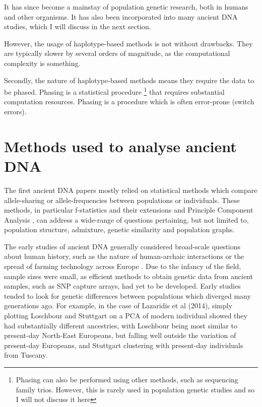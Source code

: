 It has since become a mainstay of population genetic research, both in humans and other organisms. It has also been incorporated into many ancient DNA studies, which I will discuss in the next section. 

However, the usage of haplotype-based methods is not without drawbacks. They are typically slower by several orders of magnitude, as the computational complexity is something. 

Secondly, the nature of haplotype-based methods means they require the data to be phased. Phasing is a statistical procedure \footnote{Phasing can also be performed using other methods, such as sequencing family trios. However, this is rarely used in population genetic studies and so I will not discuss it here} that requires substantial computation resources. Phasing is a procedure which is often error-prone (switch errors).


\section{Methods used to analyse ancient DNA}

The first ancient DNA papers mostly relied on statistical methods which compare allele-sharing or allele-frequencies between populations or individuals. These methods, in particular f-statistics and their extensions \cite{Green2010, Patterson2012, peter2016admixture} and Principle Component Analysis \cite{price2006principal}, can address a wide-range of questions pertaining, but not limited to, population structure, admixture, genetic similarity and population graphs. 

The early studies of ancient DNA generally considered broad-scale questions about human history, such as the nature of human-archaic interactions or the spread of farming technology across Europe \cite{Lazaridis2014}. Due to the infancy of the field, sample sizes were small, as efficient methods to obtain genetic data from ancient samples, such as SNP capture arrays, had yet to be developed. Early studies tended to look for genetic differences between populations which diverged many generations ago. For example, in the case of Lazaridis et al (2014), simply plotting Loschbour and Stuttgart on a PCA of modern individual showed they had substantially different ancestries, with Loschbour being most similar to present-day North-East Europeans, but falling well outside the variation of present-day Europeans, and Stuttgart clustering with present-day individuals from Tuscany. 

